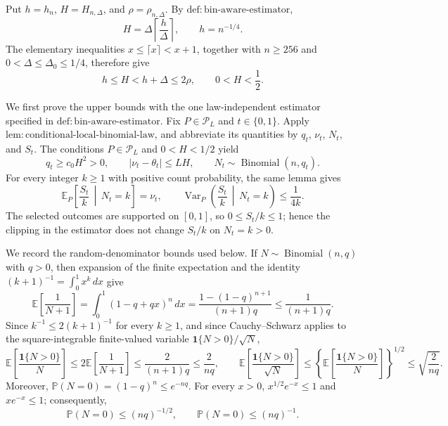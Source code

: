 Put \(h=h_n\), \(H=H_{n,\Delta}\), and \(\rho=\rho_{n,\Delta}\).  By \(\mathrm{def:bin\text{-}aware\text{-}estimator}\),
\[
 H=\Delta\left\lceil\frac{h}{\Delta}\right\rceil,
 \qquad h=n^{-1/4}.
\]
The elementary inequalities \(x\leq\lceil x\rceil<x+1\), together with \(n\geq256\) and \(0<\Delta\leq\Delta_0\leq1/4\), therefore give
\[
 h\leq H<h+\Delta\leq2\rho,
 \qquad 0<H<\frac12.
\]

We first prove the upper bounds with the one law-independent estimator specified in \(\mathrm{def:bin\text{-}aware\text{-}estimator}\).  Fix \(P\in\mathcal P_L\) and \(t\in\{0,1\}\).  Apply \(\mathrm{lem:conditional\text{-}local\text{-}binomial\text{-}law}\), and abbreviate its quantities by \(q_t\), \(\nu_t\), \(N_t\), and \(S_t\).  The conditions \(P\in\mathcal P_L\) and \(0<H<1/2\) yield
\[
 q_t\geq c_0H^2>0,
 \qquad |\nu_t-\theta_t|\leq LH,
 \qquad N_t\sim\operatorname{Binomial}(n,q_t).
\]
For every integer \(k\geq1\) with positive count probability, the same lemma gives
\[
 \mathbb E_P\!\left[\frac{S_t}{k}\,\middle|\,N_t=k\right]=\nu_t,
 \qquad
 \operatorname{Var}_P\!\left(\frac{S_t}{k}\,\middle|\,N_t=k\right)\leq\frac1{4k}.
\]
The selected outcomes are supported on \([0,1]\), so \(0\leq S_t/k\leq1\); hence the clipping in the estimator does not change \(S_t/k\) on \(N_t=k>0\).

We record the random-denominator bounds used below.  If \(N\sim\operatorname{Binomial}(n,q)\) with \(q>0\), then expansion of the finite expectation and the identity \((k+1)^{-1}=\int_0^1x^k\,dx\) give
\[
 \mathbb E\!\left[\frac1{N+1}\right]
 =\int_0^1(1-q+qx)^n\,dx
 =\frac{1-(1-q)^{n+1}}{(n+1)q}
 \leq\frac1{(n+1)q}.
\]
Since \(k^{-1}\leq2(k+1)^{-1}\) for every \(k\geq1\), and since Cauchy--Schwarz applies to the square-integrable finite-valued variable \(\mathbf1\{N>0\}/\sqrt N\),
\[
 \mathbb E\!\left[\frac{\mathbf1\{N>0\}}N\right]
 \leq2\mathbb E\!\left[\frac1{N+1}\right]
 \leq\frac2{(n+1)q}
 \leq\frac2{nq},
 \qquad
 \mathbb E\!\left[\frac{\mathbf1\{N>0\}}{\sqrt N}\right]
 \leq\left\{\mathbb E\!\left[\frac{\mathbf1\{N>0\}}N\right]\right\}^{1/2}
 \leq\sqrt{\frac2{nq}}.
\]
Moreover, \(\mathbb P(N=0)=(1-q)^n\leq e^{-nq}\).  For every \(x>0\), \(x^{1/2}e^{-x}\leq1\) and \(xe^{-x}\leq1\); consequently,
\[
 \mathbb P(N=0)\leq(nq)^{-1/2},
 \qquad
 \mathbb P(N=0)\leq(nq)^{-1}.
\]

